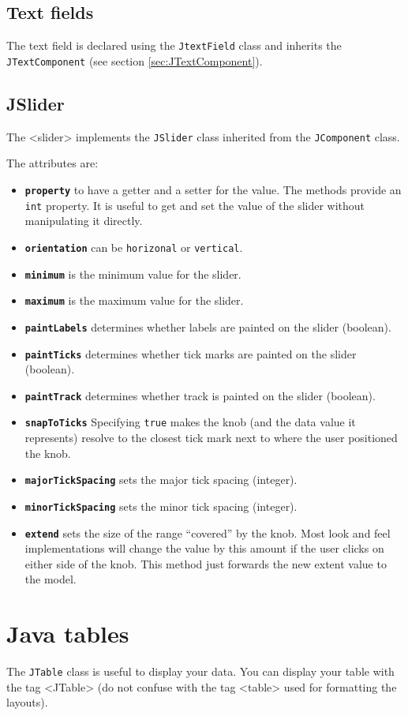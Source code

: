 \documentclass[a4paper,onecolumn,10pt]{book}
\newcommand{\jclass}[1]{\texttt{\small #1}}
\newcommand{\tag}[1]{\textsf{<#1>}}
\newcommand{\attr}[1]{\texttt{\small \textbf{#1}}}
\begin{document}
\subsection{\label{sec:JTextField}Text fields}
The text field is declared using the \jclass{JtextField} class and inherits the
\jclass{JTextComponent} (see section \ref{sec:JTextComponent}).
 

\subsection{JSlider}
The \tag{slider} implements the \jclass{JSlider} class inherited from
the \jclass{JComponent} class.

The attributes are:
\begin{itemize}
	\item \attr{property} to have a getter and a setter for the value.
		The methods provide an \jclass{int} property. It is useful to
		get and set the value of the slider without manipulating it
		directly.
	\item \attr{orientation} can be \verb|horizonal| or
		\verb|vertical|.
  \item \attr{minimum} is the minimum value for the slider.
	\item \attr{maximum} is the maximum value for the slider.
  \item \attr{paintLabels} determines whether labels are
		painted on the slider (boolean).
  \item \attr{paintTicks} determines whether tick marks are
		painted on the slider (boolean).
  \item \attr{paintTrack} determines whether track is
		painted on the slider (boolean).
  \item \attr{snapToTicks} Specifying \verb|true| makes the
		knob (and the data value it represents) resolve to
		the closest tick mark next to where the user positioned
		the knob.
  \item \attr{majorTickSpacing} sets the major tick spacing
		(integer).
  \item \attr{minorTickSpacing} sets the minor tick spacing
		(integer).
  \item \attr{extend} sets the size of the range ``covered'' by the knob.
		Most look and feel implementations will change the
		value by this amount if the user clicks on either side
		of the knob. This method just forwards the new extent
		value to the model.
\end{itemize}

\section{\label{sec:JTable}Java tables}
The \jclass{JTable} class is useful to display your data.
You can display your table with the tag \tag{JTable} (do
not confuse with the tag \tag{table} used for formatting the
layouts).
\end{document}
